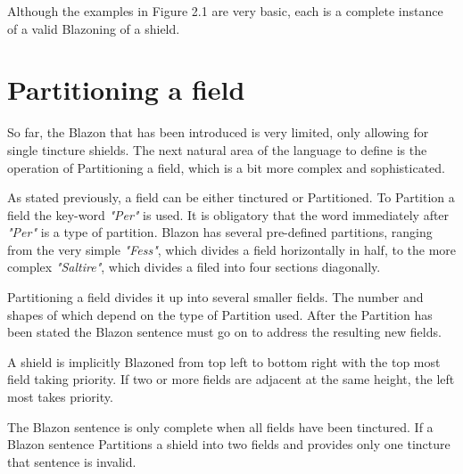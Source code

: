 Although the examples in Figure 2.1 are very basic, each is a complete instance of a valid Blazoning of a shield.







\section{Partitioning a field}
So far, the Blazon that has been introduced is very limited, only allowing for single tincture shields.  The next natural area of the language to define is the operation of Partitioning a field, which is a bit more complex and sophisticated.  

As stated previously, a field can be either tinctured or Partitioned.  To Partition a field the key-word \emph{"Per"} is used. It is obligatory that the word immediately after \emph{"Per"} is a type of partition.  Blazon has several pre-defined partitions, ranging from the very simple \emph{"Fess"}, which divides a field horizontally in half, to the more complex \emph{"Saltire"}, which divides a filed into four sections diagonally. 

Partitioning a field divides it up into several smaller fields.  The number and shapes of which depend on the type of Partition used.  After the Partition has been stated the Blazon sentence must go on to address the resulting new fields. 

A shield is implicitly Blazoned from top left to bottom right with the top most field taking priority. If two or more fields are adjacent at the same height, the left most takes priority.  

The Blazon sentence is only complete when all fields have been tinctured.  If a Blazon sentence Partitions a shield into two fields and provides only one tincture that sentence is invalid.  





